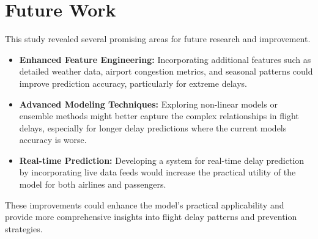 \section{Future Work}
This study revealed several promising areas for future research and improvement.
\begin{itemize}
\item \textbf{Enhanced Feature Engineering:} Incorporating additional features such as detailed weather data, airport congestion metrics, and seasonal patterns could improve prediction accuracy, particularly for extreme delays.

\item \textbf{Advanced Modeling Techniques:} Exploring non-linear models or ensemble methods might better capture the complex relationships in flight delays, especially for longer delay predictions where the current models accuracy is worse.

\item \textbf{Real-time Prediction:} Developing a system for real-time delay prediction by incorporating live data feeds would increase the practical utility of the model for both airlines and passengers.

\end{itemize}
These improvements could enhance the model's practical applicability and provide more comprehensive insights into flight delay patterns and prevention strategies.